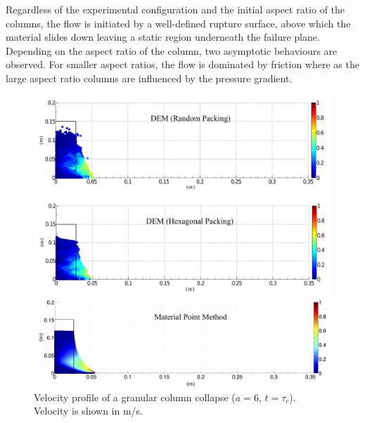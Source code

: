 Regardless of the experimental configuration and the initial aspect ratio of 
the columns, the flow is initiated by a well-defined rupture surface, above 
which the material slides down leaving a static region underneath the failure 
plane. Depending on the aspect ratio of the column, two asymptotic behaviours 
are observed. For smaller aspect ratios, the flow is dominated by friction 
where as the large aspect ratio columns are influenced by the pressure gradient.

\begin{figure}[tbhp]
\centering
\includegraphics[width=\textwidth]{a6tc}
\caption[Velocity profile of a granular column collapse ($a = 6$,  
$t=\tau_c$).]{Velocity profile of a granular column collapse ($a = 6$,  
$t=\tau_c$). Velocity is shown in m/s.}
\label{fig:a6tc}
\end{figure}


